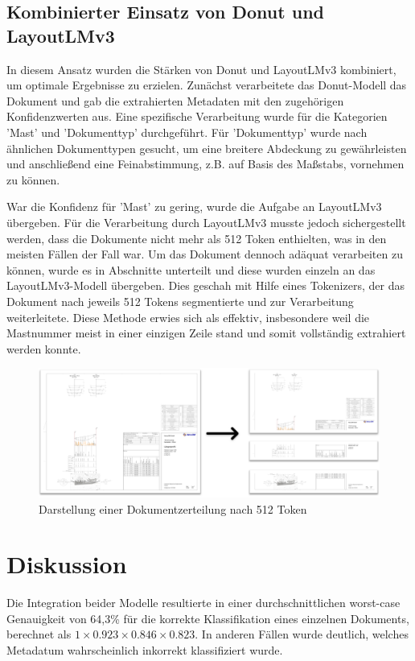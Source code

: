 \documentclass[12pt,a4paper,twoside]{article}
\newcommand\myworries[1]{\textcolor{red}{#1}}
\begin{document}
\subsection{Kombinierter Einsatz von Donut und LayoutLMv3}
In diesem Ansatz wurden die Stärken von Donut und LayoutLMv3 kombiniert, um optimale Ergebnisse zu erzielen. Zunächst verarbeitete das Donut-Modell das Dokument und gab die extrahierten Metadaten mit den zugehörigen Konfidenzwerten aus. Eine spezifische Verarbeitung wurde für die Kategorien 'Mast' und 'Dokumenttyp' durchgeführt. Für 'Dokumenttyp' wurde nach ähnlichen Dokumenttypen gesucht, um eine breitere Abdeckung zu gewährleisten und anschließend eine Feinabstimmung, z.B. auf Basis des Maßstabs, vornehmen zu können.

War die Konfidenz für 'Mast' zu gering, wurde die Aufgabe an LayoutLMv3 übergeben. Für die Verarbeitung durch LayoutLMv3 musste jedoch sichergestellt werden, dass die Dokumente nicht mehr als 512 Token enthielten, was in den meisten Fällen der Fall war. Um das Dokument dennoch adäquat verarbeiten zu können, wurde es in Abschnitte unterteilt und diese wurden einzeln an das LayoutLMv3-Modell übergeben. Dies geschah mit Hilfe eines Tokenizers, der das Dokument nach jeweils 512 Tokens segmentierte und zur Verarbeitung weiterleitete. Diese Methode erwies sich als effektiv, insbesondere weil die Mastnummer meist in einer einzigen Zeile stand und somit vollständig extrahiert werden konnte.
\begin{figure}[H]
    \centering
    \includegraphics[width=1.0\linewidth]{DOKUMENT-Segmentation-Horizontal.png}
    \caption{Darstellung einer Dokumentzerteilung nach 512 Token}
    \label{fig:enter-label}
\end{figure}


\section{Diskussion}
Die Integration beider Modelle resultierte in einer durchschnittlichen worst-case Genauigkeit von 64,3\% für die korrekte Klassifikation eines einzelnen Dokuments, berechnet als \(1 \times 0.923 \times 0.846 \times 0.823\). In anderen Fällen wurde deutlich, welches Metadatum wahrscheinlich inkorrekt klassifiziert wurde.
\end{document}

